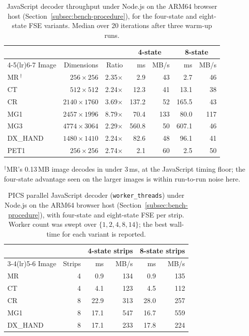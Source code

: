 \documentclass[journal]{IEEEtran}
\begin{document}
\begin{table}[htbp]
\centering
\caption{JavaScript decoder throughput under Node.js on the ARM64 browser
host (Section~\ref{subsec:bench-procedure}), for the four-state and
eight-state FSE variants. Median over 20 iterations after three warm-up
runs.}
\label{tab:js-perf}
\begin{tabular}{lrrrrrr}
\toprule
 & & & \multicolumn{2}{c}{4-state} & \multicolumn{2}{c}{8-state} \\
\cmidrule(lr){4-5}\cmidrule(lr){6-7}
Image & Dimensions & Ratio & ms & MB/s & ms & MB/s \\
\midrule
MR\,$^\dagger$ & $256{\times}256$   & 2.35$\times$ &   2.9 &  43 &   2.7 &  46 \\
CT  & $512{\times}512$   & 2.24$\times$ &  12.3 &  41 &  13.1 &  38 \\
CR  & $2140{\times}1760$ & 3.69$\times$ & 137.2 &  52 & 165.5 &  43 \\
MG1 & $2457{\times}1996$ & 8.79$\times$ &  70.4 & 133 &  80.0 & 117 \\
MG3 & $4774{\times}3064$ & 2.29$\times$ & 560.8 &  50 & 607.1 &  46 \\
DX\_HAND & $1480{\times}1410$ & 2.24$\times$ &  82.6 &  48 &  96.1 &  41 \\
PET1 & $256{\times}256$   & 2.74$\times$ &   2.1 &  60 &   2.5 &  50 \\
\bottomrule
\end{tabular}

\vspace{2pt}
{\scriptsize $^\dagger$MR's 0.13\,MB image decodes in under 3\,ms, at the
JavaScript timing floor; the four-state advantage seen on the larger images
is within run-to-run noise here.}
\end{table}

\begin{table}[htbp]
\centering
\caption{PICS parallel JavaScript decoder (\texttt{worker\_threads}) under
Node.js on the ARM64 browser host
(Section~\ref{subsec:bench-procedure}), with four-state and eight-state FSE
per strip. Worker count was swept over $\{1,2,4,8,14\}$; the best wall-time
for each variant is reported.}
\label{tab:pics-js}
\begin{tabular}{lrrrrr}
\toprule
 & & \multicolumn{2}{c}{4-state strips} & \multicolumn{2}{c}{8-state strips} \\
\cmidrule(lr){3-4}\cmidrule(lr){5-6}
Image & Strips &   ms & MB/s &   ms & MB/s \\
\midrule
MR  & 4 &   0.9 & 134 &   0.9 & 135 \\
CT  & 4 &   4.1 & 123 &   4.5 & 112 \\
CR  & 8 &  22.9 & 313 &  28.0 & 257 \\
MG1 & 8 &  17.1 & 547 &  16.7 & 559 \\
DX\_HAND & 8 &  17.1 & 233 &  17.8 & 224 \\
\bottomrule
\end{tabular}
\end{table}
\end{document}
